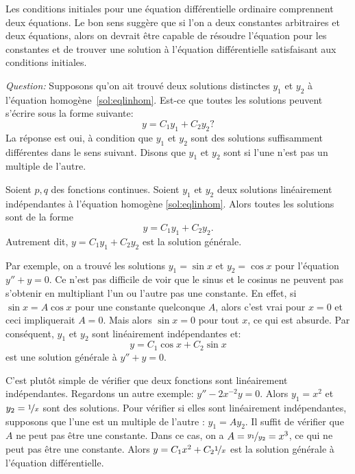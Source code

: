 \medskip

Les conditions initiales pour une équation différentielle ordinaire comprennent deux équations. Le bon sens suggère que si l'on a deux constantes arbitraires et deux équations, alors on devrait être capable de résoudre l'équation pour les constantes et de trouver une solution à l'équation différentielle satisfaisant aux conditions initiales. 

\emph{Question:} Supposons qu'on ait trouvé deux solutions distinctes $y_1$ et $y_2$ à l'équation homogène~\eqref{sol:eqlinhom}.  Est-ce que toutes les solutions peuvent s'écrire sous la forme suivante:
%
\begin{equation*}
y = C_1 y_1 + C_2 y_2?
\end{equation*}
%
La réponse est oui, à condition que $y_1$ et $y_2$ sont des solutions suffisamment différentes dans le sens suivant.  Disons que $y_1$ et $y_2$ sont \emph{} si l'une n'est pas un multiple de l'autre.

\begin{theorem}
Soient $p, q$ des fonctions continues.
Soient $y_1$ et $y_2$ deux solutions linéairement indépendantes à l'équation homogène \eqref{sol:eqlinhom}. 
Alors toutes les solutions sont de la forme 
\begin{equation*}
y = C_1 y_1 + C_2 y_2 .
\end{equation*}
Autrement dit, $y = C_1 y_1 + C_2 y_2$ est la solution générale.
\end{theorem}

Par exemple, on a trouvé les solutions 
$y_1 = \sin x$ et $y_2 = \cos x$ pour l'équation $y'' + y = 0$.  Ce n'est pas difficile de voir que le sinus et le cosinus ne peuvent pas s'obtenir en multipliant l'un ou l'autre pas une constante.
En effet, si $\sin x = A \cos x$ pour une constante quelconque $A$,
alors c'est vrai pour $x=0$ et ceci impliquerait  $A = 0$.  Mais alors $\sin x = 0$ pour tout 
$x$, ce qui est absurde.
Par conséquent, $y_1$ et $y_2$ sont linéairement indépendantes et: 
\begin{equation*}
y = C_1 \cos x + C_2 \sin x 
\end{equation*}
est une solution générale à $y'' + y = 0$.


C'est plutôt simple de vérifier que deux fonctions sont linéairement indépendantes. Regardons un autre exemple:    $y''-2x^{-2}y = 0$.  Alors $y_1 = x^2$ et $y_2 =
\nicefrac{1}{x}$ sont des solutions.  Pour vérifier si elles sont linéairement indépendantes, supposons que l'une est un  multiple de l'autre :  $y_1 = A y_2$.  Il suffit de vérifier que  $A$ ne peut pas être une constante.  Dans ce cas, on a $A =
\nicefrac{y_1}{y_2} = x^3$, ce qui ne peut pas être une constante. Alors $y = C_1 x^2 + C_2 \nicefrac{1}{x}$ est la solution générale à l'équation différentielle.

